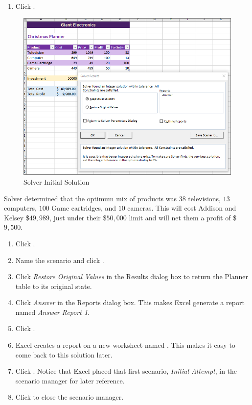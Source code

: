 \begin{enumerate}[resume]
	\item Click .
\end{enumerate}

\begin{figure}[H]
	\centering
	\includegraphics[width=\maxwidth{.95\linewidth}]{gfx/ch08_fig82}
	\caption{Solver Initial Solution}
	\label{08:fig82}
\end{figure}

Solver determined that the optimum mix of products was $ 38 $ televisions, $ 13 $ computers, $ 100 $ Game cartridges, and $ 10 $ cameras. This will cost Addison and Kelsey \$$ 49,989 $, just under their \$$ 50,000 $ limit and will net them a profit of \$$ 9,500 $. 

\begin{enumerate}[resume]
	\item Click .
	\item Name the scenario  and click .
	\item Click \textit{Restore Original Values} in the Results dialog box to return the Planner table to its original state.
	\item Click \textit{Answer} in the Reports dialog box. This makes Excel generate a report named \textit{Answer Report 1}.
	\item Click .
	\item Excel creates a report on a new worksheet named . This makes it easy to come back to this solution later.
	\item Click .	Notice that Excel placed that first scenario, \textit{Initial Attempt}, in the scenario manager for later reference.
	\item Click  to close the scenario manager.
\end{enumerate}

